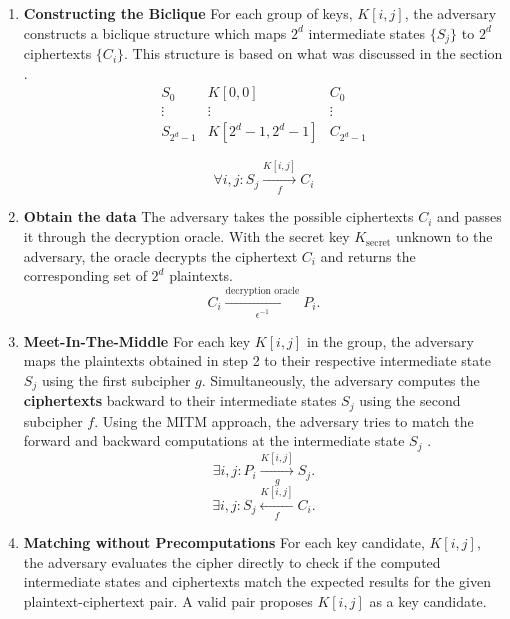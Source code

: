 \documentclass{report}
\begin{document}
 \begin{enumerate}[start = 1, label={(\bfseries Step\arabic*):}]
    \item \textbf{Constructing the Biclique} For each group of keys, \( K[i, j] \), the adversary constructs a biclique structure which maps \( 2^d \) intermediate states \( \{S_j\} \) to \( 2^d \) ciphertexts \( \{C_i\} \). This structure is based on what was discussed in the section \textit{}.
            \begin{equation}
                \begin{array}{ccc}
                    S_0 & K[0,0] & C_0 \\
                    \vdots & \vdots & \vdots \\
                    S_{2^d-1} & K[2^d-1,2^d-1] & C_{2^d-1}
                    \end{array}
            \end{equation}
                
            \begin{equation}
                \forall i, j : S_j \xrightarrow[\quad f \quad]{K[i, j]} C_i
            \end{equation}

    \item \textbf{Obtain the data} The adversary takes the possible ciphertexts $C_i$ and passes it through the decryption oracle. With the secret key $K_{\text{secret}}$ unknown to the adversary, the oracle decrypts the ciphertext $C_i$ and returns the corresponding set of $2^d$ plaintexts.
            \begin{equation}
                C_i \xrightarrow[\epsilon^{-1}]{\text{decryption oracle}} P_i.
            \end{equation}
    \item \textbf{Meet-In-The-Middle} For each key $K[i, j]$ in the group, the adversary maps the plaintexts obtained in step 2 to their respective intermediate state $S_j$ using the first subcipher $g$. Simultaneously, the adversary computes the \textbf{ciphertexts} backward to their intermediate states $S_j$ using the second subcipher $f$. Using the MITM approach, the adversary tries to match the forward and backward computations at the intermediate state $S_j$ .
            \begin{equation}
                \exists i, j : P_i \xrightarrow[g]{K[i, j]} S_j.
            \end{equation}
            \begin{equation}
                \exists i, j : S_j \xleftarrow[f]{K[i, j]} C_i.
            \end{equation}
    \item \textbf{Matching without Precomputations} For each key candidate, $K[i, j]$, the adversary evaluates the cipher directly to check if the computed intermediate states and ciphertexts match the expected results for the given plaintext-ciphertext pair. A valid pair proposes $K[i, j]$ as a key candidate.


 \end{enumerate}
\end{document}
